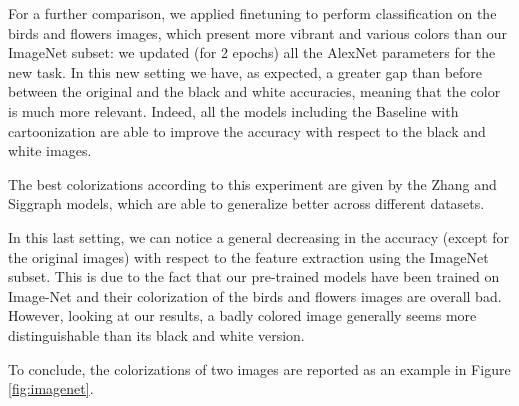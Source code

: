 For a further comparison, we applied finetuning to perform classification on the birds and flowers images, which present more vibrant and various colors than our ImageNet subset: we updated (for 2 epochs) all the AlexNet parameters for the new task. In this new setting we have, as expected, a greater gap than before between the original and the black and white accuracies, meaning that the color is much more relevant. Indeed, all the models including the Baseline with cartoonization are able to improve the accuracy with respect to the black and white images.

The best colorizations according to this experiment are given by the Zhang and Siggraph models, which are able to generalize better across different datasets.

In this last setting, we can notice a general decreasing in the accuracy (except for the original images) with respect to the feature extraction using the ImageNet subset. This is due to the fact that our pre-trained models have been trained on Image-Net and their colorization of the birds and flowers images are overall bad. However, looking at our results, a badly colored image generally seems more distinguishable than its black and white version.

To conclude, the colorizations of two images are reported as an example in Figure \ref{fig:imagenet}.

